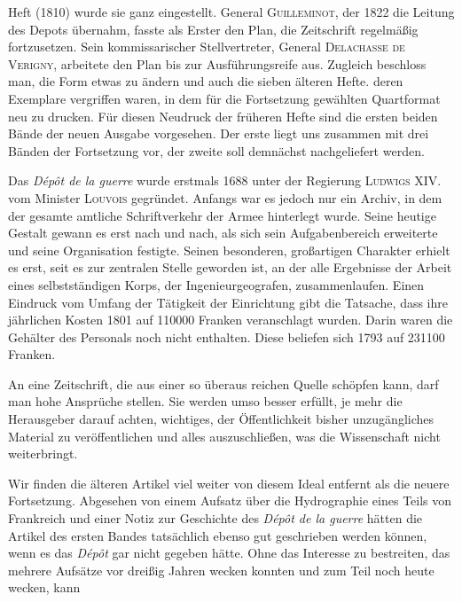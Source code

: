 %
Heft (1810) wurde sie ganz eingestellt. General \textsc{Guilleminot}, der 1822 die Leitung des Depots übernahm, fasste als Erster den Plan, die Zeitschrift regelmäßig fortzusetzen. Sein kommissarischer Stellvertreter, General \textsc{Delachasse de Verigny}, arbeitete den Plan bis zur Ausführungsreife aus. Zugleich beschloss man, die Form etwas zu ändern und auch die sieben älteren Hefte. deren Exemplare vergriffen waren, in dem für die Fortsetzung gewählten Quartformat neu zu drucken. Für diesen Neudruck der früheren Hefte sind die ersten beiden Bände der neuen Ausgabe vorgesehen. Der erste liegt uns zusammen mit drei Bänden der Fortsetzung vor, der zweite soll demnächst nachgeliefert werden.

Das \textit{Dépôt de la guerre} wurde erstmals 1688 unter der Regierung \textsc{Ludwigs} XIV. vom Minister \textsc{Louvois} gegründet. Anfangs war es jedoch nur ein Archiv, in dem der gesamte amtliche Schriftverkehr der Armee hinterlegt wurde. Seine heutige Gestalt gewann es erst nach und nach, als sich sein Aufgabenbereich erweiterte und seine Organisation festigte. Seinen besonderen, großartigen Charakter erhielt es erst, seit es zur zentralen Stelle geworden ist, an der alle Ergebnisse der Arbeit eines selbstständigen Korps, der Ingenieurgeografen, zusammenlaufen. Einen Eindruck vom Umfang der Tätigkeit der Einrichtung gibt die Tatsache, dass ihre jährlichen Kosten 1801 auf 110000 Franken veranschlagt wurden. Darin waren die Gehälter des Personals noch nicht enthalten. Diese beliefen sich 1793 auf 231100 Franken.

An eine Zeitschrift, die aus einer so überaus reichen Quelle schöpfen kann, darf man hohe Ansprüche stellen. Sie werden umso besser erfüllt, je mehr die Herausgeber darauf achten, wichtiges, der Öffentlichkeit bisher unzugängliches Material zu veröffentlichen und alles auszuschließen, was die Wissenschaft nicht weiterbringt.

Wir finden die älteren Artikel viel weiter von diesem Ideal entfernt als die neuere Fortsetzung. Abgesehen von einem Aufsatz über die Hydrographie eines Teils von Frankreich und einer Notiz zur Geschichte des \textit{Dépôt de la guerre} hätten die Artikel des ersten Bandes tatsächlich ebenso gut geschrieben werden können, wenn es das \textit{Dépôt} gar nicht gegeben hätte. Ohne das Interesse zu bestreiten, das mehrere Aufsätze vor dreißig Jahren wecken konnten und zum Teil noch heute wecken, kann
